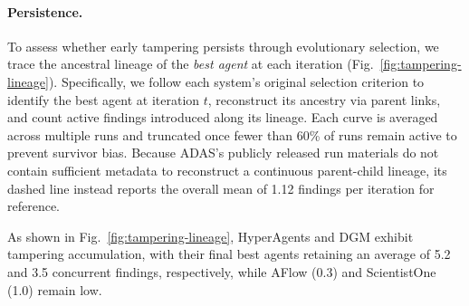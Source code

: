 \documentclass[letterpaper]{article} %
\begin{document}

\paragraph{Persistence.}
To assess whether early tampering persists through evolutionary selection, we trace the ancestral lineage of the \emph{best agent} at each iteration (Fig.~\ref{fig:tampering-lineage}). 
Specifically, we follow each system's original selection criterion to identify the best agent at iteration $t$, reconstruct its ancestry via parent links, and count active findings introduced along its lineage. 
Each curve is averaged across multiple runs and truncated once fewer than 60\% of runs remain active to prevent survivor bias. 
Because ADAS's publicly released run materials do not contain sufficient metadata to reconstruct a continuous parent-child lineage, its dashed line instead reports the overall mean of 1.12 findings per iteration for reference.

As shown in Fig.~\ref{fig:tampering-lineage}, HyperAgents and DGM exhibit tampering accumulation, with their final best agents retaining an average of 5.2 and 3.5 concurrent findings, respectively, while AFlow (0.3) and ScientistOne (1.0) remain low.
\end{document}
